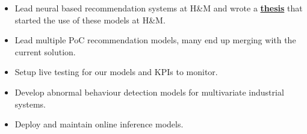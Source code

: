 \documentclass[10pt,a4paper,ragged2e]{texfiles/altacv}
\begin{document}

\begin{fullwidth}
\makecvheader
\end{fullwidth}




\begin{itemize}
    \item Lead neural based recommendation systems at H\&M and wrote a \href{https://github.com/jiwidi/MASTER_THESIS/blob/master/thesis.pdf}{\textbf{thesis}} that started the use of these models at H\&M.
    \item Lead multiple PoC recommendation models, many end up merging with the current solution.
    \item Setup live testing for our models and KPIs to monitor.
\end{itemize}

\vspace{10px}

\begin{itemize}
    \item Develop abnormal behaviour detection models for multivariate industrial systems.
    \item Deploy and maintain online inference models.
\end{itemize}
\end{document}
